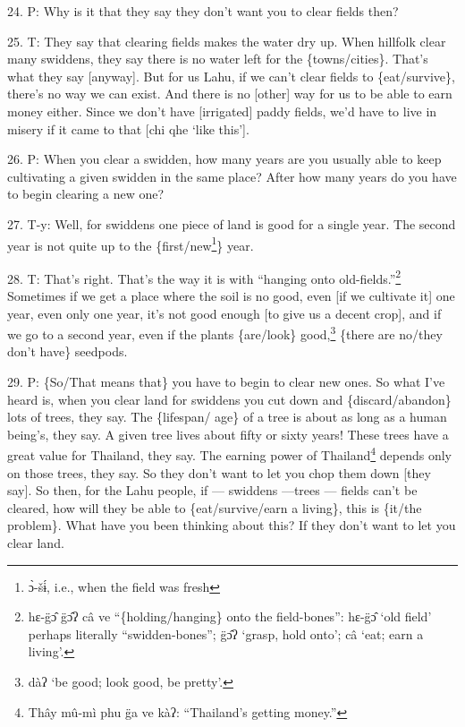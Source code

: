 24. P: Why is it that they say they don't want you to clear fields then?

25. T: They say that clearing fields makes the water dry up. When hillfolk clear
many swiddens, they say there is no water left for the \{towns/cities\}. That's
what they say [anyway]. But for us Lahu, if we can't clear fields to \{eat/survive\},
there's no way we can exist. And there is no [other] way for us to be able to earn
money either. Since we don't have [irrigated] paddy fields, we'd have to live in
misery if it came to that [chi qhe `like this'].

26. P: When you clear a swidden, how many years are you usually able to keep cultivating
a given swidden in the same place? After how many years do you have to begin clearing
a new one?

27. T-y: Well, for swiddens one piece of land is good for a single year. The second
year is not quite up to the \{first/new\footnote{ɔ̀-šɨ́, i.e., when the field was fresh}\} year.

28. T: That's right. That's the way it is with ``hanging onto old-fields.''\footnote{hɛ-g̈ɔ̂ g̈ɔ̂ʔ câ ve ``\{holding/hanging\} onto the field-bones'': hɛ-g̈ɔ̂ `old field' perhaps literally ``swidden-bones''; g̈ɔ̂ʔ `grasp, hold onto'; câ `eat; earn a living'.}
Sometimes if we get a place where the soil is no good, even [if we cultivate it]
one year, even only one year, it's not good enough [to give us a decent crop],
and if we go to a second year, even if the plants \{are/look\} good,\footnote{dàʔ `be good; look good, be pretty'.} \{there
are no/they don't have\} seedpods.

29. P: \{So/That means that\} you have to begin to clear new ones. So what I've
heard is, when you clear land for swiddens you cut down and \{discard/abandon\}
lots of trees, they say. The \{lifespan/ age\} of a tree is about as long as a
human being's, they say. A given tree lives about fifty or sixty years! These trees
have a great value for Thailand, they say. The earning power of Thailand\footnote{Thây mû-mì phu g̈a ve kàʔ: ``Thailand's getting money.''} depends
only on those trees, they say. So they don't want to let you chop them down [they
say]. So then, for the Lahu people, if --- swiddens ---trees --- fields can't be
cleared, how will they be able to \{eat/survive/earn a living\}, this is \{it/the
problem\}. What have you been thinking about this? If they don't want to let you
clear land.

